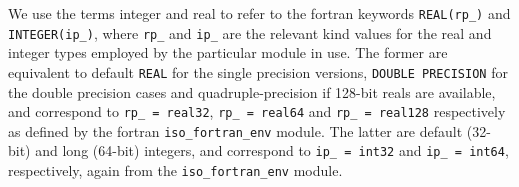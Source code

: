 
\galkinds
We use the terms integer and real to refer to the fortran
keywords {\tt REAL(rp\_)} and {\tt INTEGER(ip\_)}, where 
{\tt rp\_} and {\tt ip\_} are the relevant kind values for the
real and integer types employed by the particular module in use. 
The former are equivalent to
default {\tt REAL} for the single precision versions,
{\tt DOUBLE PRECISION} for the double precision cases
and quadruple-precision if 128-bit reals are available, and 
correspond to {\tt rp\_ = real32}, {\tt rp\_ = real64} and
{\tt rp\_ = real128} respectively as defined by the 
fortran {\tt iso\_fortran\_env} module.
The latter are default (32-bit) and long (64-bit) integers, and
correspond to {\tt ip\_ = int32} and {\tt ip\_ = int64},
respectively, again from the {\tt iso\_fortran\_env} module.
